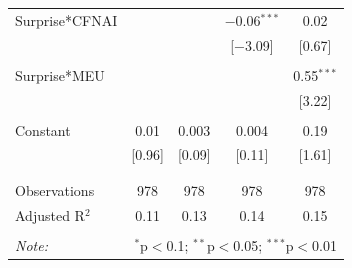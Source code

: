 \documentclass[12pt]{article}
\begin{document}
\begin{table}[!htbp]
\begin{tabular}{@{\extracolsep{5pt}}lcccc}
 Surprise*CFNAI &  &  & $-$0.06$^{***}$ & 0.02 \\ 
  &  &  & [$-$3.09] & [0.67] \\ 
  & & & & \\ 
 Surprise*MEU &  &  &  & 0.55$^{***}$ \\ 
  &  &  &  & [3.22] \\ 
  & & & & \\ 
 Constant & 0.01 & 0.003 & 0.004 & 0.19 \\ 
  & [0.96] & [0.09] & [0.11] & [1.61] \\ 
  & & & & \\ 
\hline \\[-1.8ex] 
Observations & 978 & 978 & 978 & 978 \\ 
Adjusted R$^{2}$ & 0.11 & 0.13 & 0.14 & 0.15 \\ 
\hline 
\hline \\[-1.8ex] 
\textit{Note:}  & \multicolumn{4}{r}{$^{*}$p$<$0.1; $^{**}$p$<$0.05; $^{***}$p$<$0.01} \\ 
\end{tabular} 
\end{table}
\end{document}

